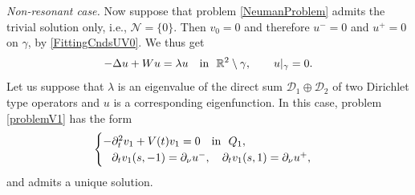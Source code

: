 \documentclass[reqno]{amsart}
\theoremstyle{plain}
\numberwithin{equation}{section}
\newcommand{\Real}{\mathbb R}
\newcommand{\pte}{\partial_t}
\begin{document}
\textit{Non-resonant case.}
Now suppose that problem \eqref{NeumanProblem} admits the trivial solution only, i.e.,  $\mathcal{N}=\{0\}$.  Then $v_0=0$ and therefore $u^-=0$ and $u^+=0$ on $\gamma$, by \eqref{FittingCndsUV0}. We thus get
\begin{equation*}
-\Delta u+Wu=\lambda u\quad \hbox{in \ } \Real^2\setminus \gamma,\qquad
 u|_{\gamma}=0.
\end{equation*}
Let us suppose that $\lambda$ is an eigenvalue of the direct sum
$\mathcal{D}_1\oplus\mathcal{D}_2$ of two Dirichlet type operators and $u$ is a corresponding eigenfunction.
In this case, problem \eqref{problemV1} has the form
\begin{equation}\label{problemV1Non}
\begin{cases}
    -\pte^2 v_1+V(t)v_1=0\quad \hbox{in \ } Q_1, \\
    \phantom{-}\partial_t v_1(s, -1)=\partial_\nu u^-, \quad
\partial_t v_1(s, 1)=\partial_\nu u^+,
\end{cases}
\end{equation}
and admits a unique solution.
\end{document}
